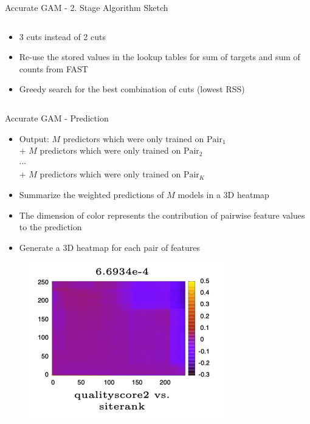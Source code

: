 \documentclass[11pt,compress,t,notes=noshow, aspectratio=169, xcolor=table]{beamer}
\begin{document}
\begin{frame}{Accurate GAM - 2. Stage Algorithm Sketch}
\begin{columns}[T, totalwidth=\textwidth]
\begin{column}{0.7\textwidth}
\begin{itemize}
            $\leadsto$Replace the shallow tree ensembles used in Intelligible GAM with a tree-like predictor (similar to FAST)
            \item 3 cuts instead of 2 cuts
            \item Re-use the stored values in the lookup tables for sum of targets and sum of counts from FAST
            \item Greedy search for the best combination of cuts (lowest RSS)
        \end{itemize}
    \end{column}
\end{columns}

\end{frame}

\begin{frame}{Accurate GAM - Prediction}
\begin{itemize}
    \item Output: $M$ predictors which were only trained on $\text{Pair}_1$ \\
    \qquad\;\; + $M$ predictors which were only trained on $\text{Pair}_2$ \\
    \qquad\;\; $\cdots$ \\
    \qquad\;\; + $M$ predictors which were only trained on $\text{Pair}_K$
    \item Summarize the weighted predictions of $M$ models in a 3D heatmap
    \item The dimension of color represents the contribution of pairwise feature values to the prediction
    \item Generate a 3D heatmap for each pair of features
\end{itemize}

\begin{figure}    
    \includegraphics[width=0.4\linewidth]
    {figure/3D Heatmap.png}
    \label{fig:3D Heatmap}
\end{figure}

\end{frame}
\end{document}
